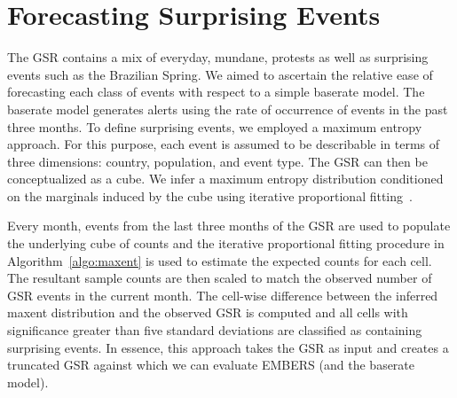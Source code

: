 \section{Forecasting Surprising Events}
\label{sec:suprising}
The GSR contains a mix of everyday, mundane, protests as well as surprising events such as the Brazilian Spring.
We aimed to ascertain the relative ease of forecasting each class of events
with respect to a simple baserate model.
The baserate model generates alerts using the rate of occurrence of events in the past three months.
To define surprising events,
we employed a maximum entropy approach. For this purpose, each event is assumed
to be describable
in terms of three dimensions: country, population, and event type. The GSR can then be conceptualized
as a cube. We infer a maximum entropy distribution conditioned on the marginals
induced by the cube using iterative proportional fitting~\cite{bishop2007discrete}.

%
%

Every month, events from the last three months of the
GSR are used to populate the underlying cube of counts and the iterative proportional fitting procedure in Algorithm~\ref{algo:maxent} is
used to estimate the expected counts
for each cell. The resultant sample counts are then scaled to
match the observed number of GSR events in the current month. The cell-wise difference between the inferred
maxent distribution and the observed GSR is computed and all cells with significance greater than five standard
deviations are classified as containing surprising events. In essence, this approach takes the GSR as input and
creates a truncated GSR against which we can evaluate EMBERS (and the baserate model).

